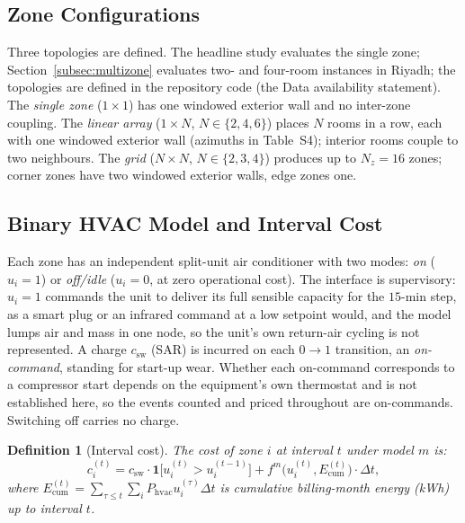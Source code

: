 \documentclass[pdflatex,sn-mathphys-num,iicol]{sn-jnl}
\theoremstyle{thmstyleone}\newtheorem{proposition}{Proposition}\newtheorem{corollary}{Corollary}
\theoremstyle{thmstyletwo}\newtheorem{remark}{Remark}\newtheorem{observation}{Observation}
\theoremstyle{thmstylethree}\newtheorem{definition}{Definition}
\newcommand{\csw}{c_{\mathrm{sw}}}
\newcommand{\Phvac}{P_{\mathrm{hvac}}}
\begin{document}
\subsection{Zone Configurations}
\label{subsec:configs}
 
Three topologies are defined. The headline study evaluates the single zone; Section~\ref{subsec:multizone} evaluates two- and four-room instances in Riyadh; the topologies are defined in the repository code (the Data availability statement). The \emph{single zone} ($1\times1$) has one windowed exterior wall and no inter-zone coupling. The \emph{linear array} ($1\times N$, $N\in\{2,4,6\}$) places $N$ rooms in a row, each with one windowed exterior wall (azimuths in Table~S4); interior rooms couple to two neighbours. The \emph{grid} ($N\times N$, $N\in\{2,3,4\}$) produces up to $N_z=16$ zones; corner zones have two windowed exterior walls, edge zones one.
 

 
\subsection{Binary HVAC Model and Interval Cost}
\label{subsec:hvac_model}
 
Each zone has an independent split-unit air conditioner with two modes: \emph{on} ($u_i=1$) or \emph{off/idle} ($u_i=0$, at zero operational cost). The interface is supervisory: $u_i=1$ commands the unit to deliver its full sensible capacity for the $15$-min step, as a smart plug or an infrared command at a low setpoint would, and the model lumps air and mass in one node, so the unit's own return-air cycling is not represented. A charge $\csw$ (SAR) is incurred on each $0\to1$ transition, an \emph{on-command}, standing for start-up wear. Whether each on-command corresponds to a compressor start depends on the equipment's own thermostat and is not established here, so the events counted and priced throughout are on-commands. Switching off carries no charge.
 
\begin{definition}[Interval cost]
\label{def:interval_cost}
The cost of zone $i$ at interval $t$ under model $m$ is:
\begin{equation}
  c_i^{(t)} = \csw\cdot\mathbf{1}\!\bigl[u_i^{(t)}>u_i^{(t-1)}\bigr]
             + f^m\!\bigl(u_i^{(t)},E_{\mathrm{cum}}^{(t)}\bigr)\cdot\Delta t,
  \label{eq:interval_cost}
\end{equation}
where $E_{\mathrm{cum}}^{(t)}=\sum_{\tau\le t}\!\sum_i\Phvac u_i^{(\tau)}\Delta t$ is cumulative billing-month energy (kWh) up to interval $t$.
\end{definition}
 
\end{document}
